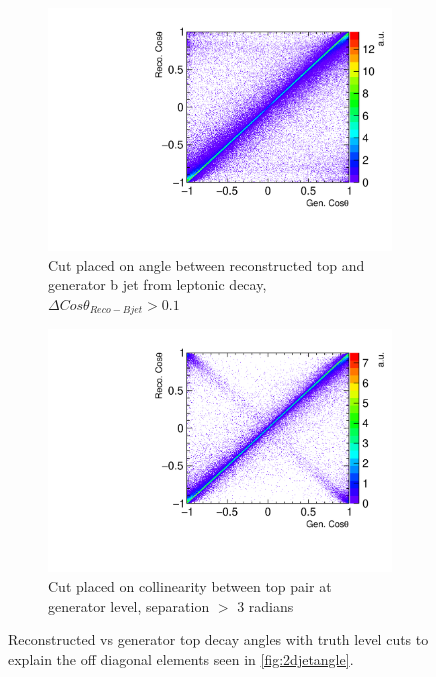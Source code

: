 \begin{figure}
  \centering
  \begin{subfigure}{.48\textwidth}
    \centering
    \includegraphics[width=1.0\textwidth]{TopAnalysis/figures/CosThetaRecoVsMC_NotNextToLepTop.pdf}%
    \caption[Cut placed on angle between reconstructed top and generator b jet from leptonic decay]{Cut placed on angle between reconstructed top and generator b jet from leptonic decay, $\Delta Cos\theta_{Reco-Bjet}>0.1$}
    \label{fig:2djetangle_farfromleptop}
  \end{subfigure}\hfill
  \begin{subfigure}{.48\textwidth}
    \centering
    \includegraphics[width=1.0\textwidth]{TopAnalysis/figures/CosThetaRecoVsMC_MCTopsWellSeparated.pdf}%
    \caption[Cut placed on collinearity between top pair at generator level]{Cut placed on collinearity between top pair at generator level, separation $>$ 3 radians}
    \label{fig:2djetangle_goodtopseparation}
  \end{subfigure}
  \caption[Reconstructed vs generator top decay angles with truth level cuts]{Reconstructed vs generator top decay angles with truth level cuts to explain the off diagonal elements seen in \ref{fig:2djetangle}.}
  \label{fig:2djetangle_explanations}
\end{figure}


